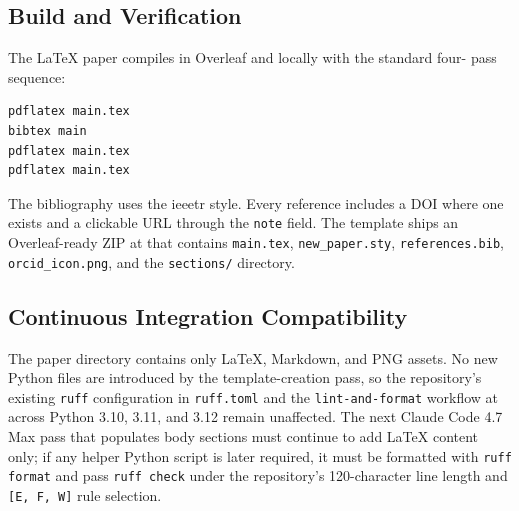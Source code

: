 \subsection{Build and Verification}
\label{sec:methods-build}

The LaTeX paper compiles in Overleaf and locally with the standard four-
pass sequence:
\begin{verbatim}
pdflatex main.tex
bibtex main
pdflatex main.tex
pdflatex main.tex
\end{verbatim}

The bibliography uses the ieeetr style. Every reference includes a DOI
where one exists and a clickable URL through the \texttt{note} field. The
template ships an Overleaf-ready ZIP at
 that
contains \texttt{main.tex}, \texttt{new\_paper.sty}, \texttt{references.bib},
\texttt{orcid\_icon.png}, and the \texttt{sections/} directory.

\subsection{Continuous Integration Compatibility}
\label{sec:methods-ci}

The paper directory contains only LaTeX, Markdown, and PNG assets. No new
Python files are introduced by the template-creation pass, so the
repository's existing \texttt{ruff} configuration in \texttt{ruff.toml} and
the \texttt{lint-and-format} workflow at 
across Python 3.10, 3.11, and 3.12 remain unaffected. The next Claude Code
4.7 Max pass that populates body sections must continue to add LaTeX
content only; if any helper Python script is later required, it must be
formatted with \texttt{ruff format} and pass \texttt{ruff check} under the
repository's 120-character line length and \texttt{[E, F, W]} rule
selection.
